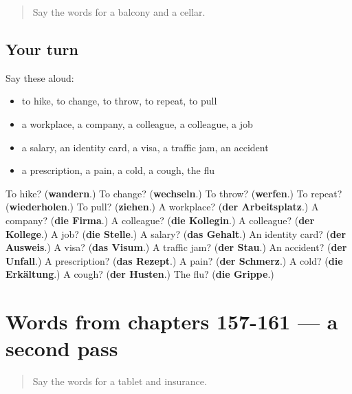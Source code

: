 \label{lesson:GE-R161-first-pass-words-from-chapters-153-156}



\begin{quote}
Say the words for a balcony and a cellar.
\end{quote}

\subsection*{Your turn}
Say these aloud:

\begin{itemize}
\raggedright
  \item to hike, to change, to throw, to repeat, to pull
  \item a workplace, a company, a colleague, a colleague, a job
  \item a salary, an identity card, a visa, a traffic jam, an accident
  \item a prescription, a pain, a cold, a cough, the flu
\end{itemize}

\begin{tcolorbox}[breakable,colback=teal!4,colframe=teal!35!black,title={Before you move on}]
To hike? (\textbf{wandern}.) To change? (\textbf{wechseln}.) To throw? (\textbf{werfen}.) To repeat? (\textbf{wiederholen}.) To pull? (\textbf{ziehen}.) A workplace? (\textbf{der Arbeitsplatz}.) A company? (\textbf{die Firma}.) A colleague? (\textbf{die Kollegin}.) A colleague? (\textbf{der Kollege}.) A job? (\textbf{die Stelle}.) A salary? (\textbf{das Gehalt}.) An identity card? (\textbf{der Ausweis}.) A visa? (\textbf{das Visum}.) A traffic jam? (\textbf{der Stau}.) An accident? (\textbf{der Unfall}.) A prescription? (\textbf{das Rezept}.) A pain? (\textbf{der Schmerz}.) A cold? (\textbf{die Erkältung}.) A cough? (\textbf{der Husten}.) The flu? (\textbf{die Grippe}.)
\end{tcolorbox}
\section[(dialogue)]{Words from chapters 157-161 — a second pass}

\label{lesson:GE-R161-second-pass-words-from-chapters-157-161}



\begin{quote}
Say the words for a tablet and insurance.
\end{quote}

